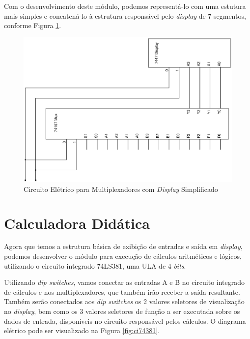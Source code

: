 \documentclass{article}
\begin{document}
Com o desenvolvimento deste módulo, podemos representá-lo com uma estutura mais
simples e concatená-lo à estrutura responsável pelo \emph{display} de 7
segmentos, conforme Figura \ref{fig:s-ci74157-ci7447}.

\begin{figure}
    \centering{}
    \includegraphics[scale=0.5,angle=270]{s-ci74157-ci7447.ps}
    \caption{Circuito Elétrico para Multiplexadores com \emph{Display}
        Simplificado}
    \label{fig:s-ci74157-ci7447}
\end{figure}

\section{Calculadora Didática}

Agora que temos a estrutura básica de exibição de entradas e saída em
\emph{display}, podemos desenvolver o módulo para execução de cálculos
aritméticos e lógicos, utilizando o circuito integrado 74LS381, uma ULA de 4
\emph{bits}.

Utilizando \emph{dip switches}, vamos conectar as entradas A e B no circuito
integrado de cálculos e nos multiplexadores, que também irão receber a saída
resultante. Também serão conectados aos \emph{dip switches} os 2 valores
seletores de visualização no \emph{display}, bem como os 3 valores seletores de
função a ser executada sobre os dados de entrada, disponíveis no circuito
responsável pelos cálculos. O diagrama elétrico pode ser visualizado na Figura
\ref{fig:ci74381}.
\end{document}
